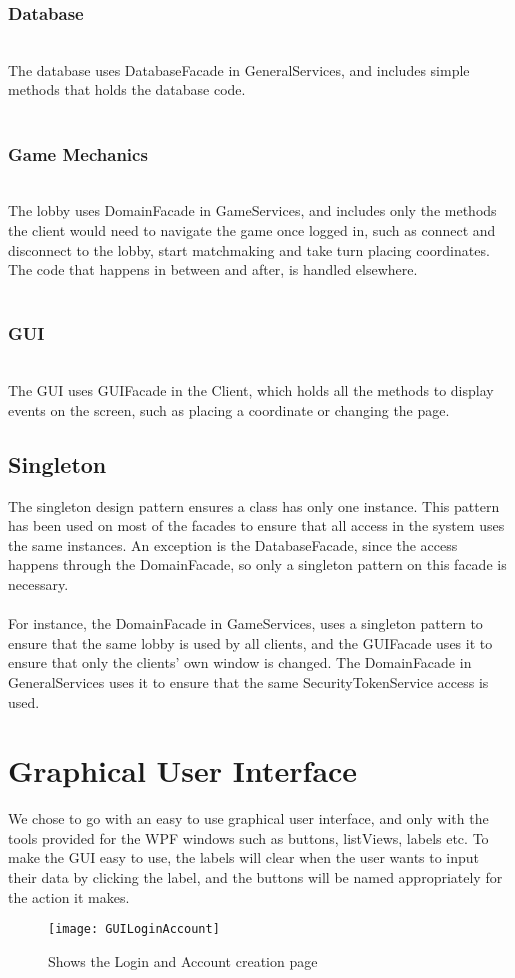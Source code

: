 \subsubsection{Database}
\\
The database uses DatabaseFacade in GeneralServices, and includes simple
methods that holds the database code.
\\
\\
\subsubsection{Game Mechanics}
\\
The lobby uses DomainFacade in GameServices, and includes only the methods
the client would need to navigate the game once logged in, such as connect
and disconnect to the lobby, start matchmaking and take turn placing
 coordinates. The code that happens in between and after, is handled elsewhere.
\\
\\
\subsubsection{GUI}
\\
The GUI uses GUIFacade in the Client, which holds all the methods to
display events on the screen, such as placing a coordinate or changing the page.
			\subsection{Singleton}
The singleton design pattern ensures a class has only one instance.
This pattern has been used on most of the facades to ensure that all access
 in the system uses the same instances. An exception is the DatabaseFacade,
  since the access happens through the DomainFacade, so only a singleton
	 pattern on this facade is necessary.
\\
\\
For instance, the DomainFacade in GameServices, uses a singleton pattern
to ensure that the same lobby is used by all clients, and the GUIFacade uses
 it to ensure that only the clients’ own window is changed. The DomainFacade
  in GeneralServices uses it to ensure that the same SecurityTokenService access is used.
		\section{Graphical User Interface}
We chose to go with an easy to use graphical user interface, and only with the
 tools provided for the WPF windows such as buttons, listViews, labels etc. To
 make the GUI easy to use, the labels will clear when the user wants to input
  their data by clicking the label, and the buttons will be named appropriately
	 for the action it makes.
\begin{figure}[h]
	\centerline{\texttt{[image: GUILoginAccount]}}
	\caption{Shows the Login and Account creation  page}
\end{figure}
\\
